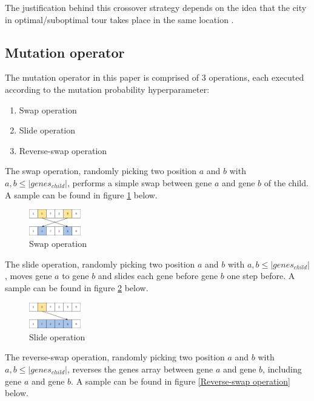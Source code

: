 \documentclass[conference]{IEEEtran}
\begin{document}
The justification behind this crossover strategy depends on the idea that the city in optimal/suboptimal tour takes place
in the same location \cite{b6}.

\subsection{Mutation operator} \label{Genetic algorithm mutation operator}
The mutation operator in this paper is comprised of 3 operations, each executed according to the mutation probability hyperparameter:

\begin{enumerate}
    \item Swap operation
    \item Slide operation
    \item Reverse-swap operation
\end{enumerate}

The swap operation, randomly picking two position $a$ and $b$ with $a, b \leq |genes_{child}|$, performs a simple swap between
gene $a$ and gene $b$ of the child. A sample can be found in figure \ref{Swap operation}
below.

\begin{figure}[h]
    \centering
    \includegraphics[width=0.20\textwidth]{images/mutation 1.png}
    \caption{Swap operation} \label{Swap operation}
\end{figure}

The slide operation, randomly picking two position $a$ and $b$ with $a, b \leq |genes_{child}|$, moves gene $a$ to gene
$b$ and slides each gene before gene $b$ one step before. A sample can be found in figure \ref{Slide operation}
below.

\begin{figure}[h]
    \centering
    \includegraphics[width=0.20\textwidth]{images/mutation 2.png}
    \caption{Slide operation} \label{Slide operation}
\end{figure}

The reverse-swap operation, randomly picking two position $a$ and $b$ with $a, b \leq |genes_{child}|$, reverses the genes
array between gene $a$ and gene $b$, including gene $a$ and gene $b$. A sample can be found in figure \ref{Reverse-swap operation}
below.
\end{document}
